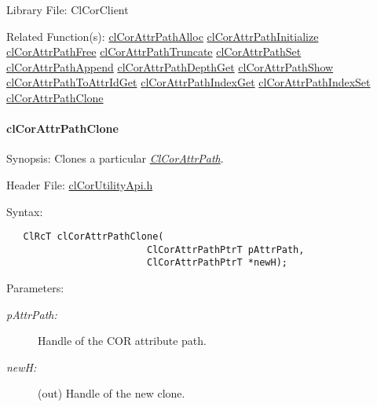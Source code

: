 \begin{Desc}
\item[Library File:]Cl\-Cor\-Client\end{Desc}
\begin{Desc}
\item[Related Function(s):]\hyperlink{group__group13}{cl\-Cor\-Attr\-Path\-Alloc} \hyperlink{group__group13}{cl\-Cor\-Attr\-Path\-Initialize} \hyperlink{group__group13}{cl\-Cor\-Attr\-Path\-Free} \hyperlink{group__group13}{cl\-Cor\-Attr\-Path\-Truncate} \hyperlink{group__group13}{cl\-Cor\-Attr\-Path\-Set} \hyperlink{group__group13}{cl\-Cor\-Attr\-Path\-Append} \hyperlink{group__group13}{cl\-Cor\-Attr\-Path\-Depth\-Get} \hyperlink{group__group13}{cl\-Cor\-Attr\-Path\-Show} \hyperlink{group__group13}{cl\-Cor\-Attr\-Path\-To\-Attr\-Id\-Get} \hyperlink{group__group13}{cl\-Cor\-Attr\-Path\-Index\-Get} \hyperlink{group__group13}{cl\-Cor\-Attr\-Path\-Index\-Set} \hyperlink{group__group13}{cl\-Cor\-Attr\-Path\-Clone} \end{Desc}
\hypertarget{pagecor267}{}\paragraph{cl\-Cor\-Attr\-Path\-Clone}\label{pagecor267}
\begin{Desc}
\item[Synopsis:]Clones a particular {\em \hyperlink{struct_cl_cor_attr_path}{Cl\-Cor\-Attr\-Path}\/}.\end{Desc}
\begin{Desc}
\item[Header File:]\hyperlink{cl_cor_utility_api_8h}{cl\-Cor\-Utility\-Api.h}\end{Desc}
\begin{Desc}
\item[Syntax:]

\footnotesize\begin{verbatim}   ClRcT clCorAttrPathClone(
                         ClCorAttrPathPtrT pAttrPath,
                         ClCorAttrPathPtrT *newH);
\end{verbatim}
\normalsize
\end{Desc}
\begin{Desc}
\item[Parameters:]
\begin{description}
\item[{\em p\-Attr\-Path:}]Handle of the COR attribute path. \item[{\em new\-H:}](out) Handle of the new clone.\end{description}
\end{Desc}
